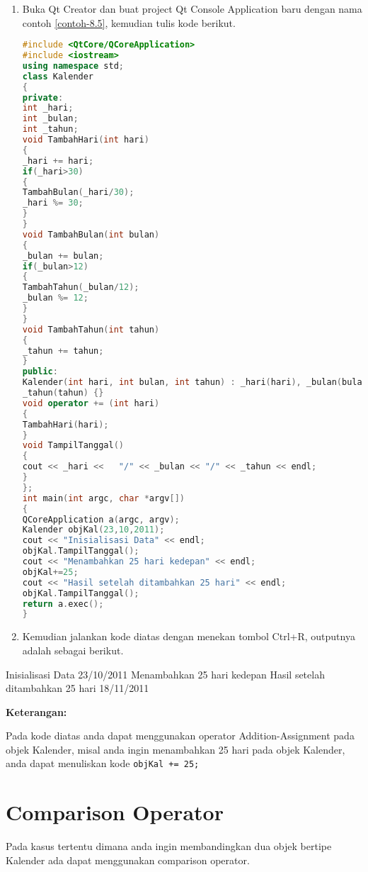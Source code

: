 \begin{enumerate}
\def\labelenumi{\arabic{enumi}.}
\item
  Buka Qt Creator dan buat project Qt Console Application baru dengan
  nama contoh \ref{contoh-8.5}, kemudian tulis kode berikut.

\begin{lstlisting}[language=c++, caption= Menggunakan Addition Assigment Operator dan Substraction
Assigment Operator. label=contoh-8.5]
#include <QtCore/QCoreApplication>
#include <iostream>
using namespace std;
class Kalender
{
private:
int _hari;
int _bulan;
int _tahun;
void TambahHari(int hari)
{
_hari += hari;
if(_hari>30)
{
TambahBulan(_hari/30);
_hari %= 30;
}
}
void TambahBulan(int bulan)
{
_bulan += bulan;
if(_bulan>12)
{
TambahTahun(_bulan/12);
_bulan %= 12;
}
}
void TambahTahun(int tahun)
{
_tahun += tahun;
}
public:
Kalender(int hari, int bulan, int tahun) : _hari(hari), _bulan(bulan),
_tahun(tahun) {}
void operator += (int hari)
{
TambahHari(hari);
}
void TampilTanggal()
{
cout << _hari <<   "/" << _bulan << "/" << _tahun << endl;
}
};
int main(int argc, char *argv[])
{
QCoreApplication a(argc, argv);
Kalender objKal(23,10,2011);
cout << "Inisialisasi Data" << endl;
objKal.TampilTanggal();
cout << "Menambahkan 25 hari kedepan" << endl;
objKal+=25;
cout << "Hasil setelah ditambahkan 25 hari" << endl;
objKal.TampilTanggal();
return a.exec();
}
\end{lstlisting}
\item
  Kemudian jalankan kode diatas dengan menekan tombol Ctrl+R, outputnya
  adalah sebagai berikut.
\end{enumerate}

\begin{lcverbatim}
Inisialisasi Data
23/10/2011
Menambahkan 25 hari kedepan
Hasil setelah ditambahkan 25 hari
18/11/2011
\end{lcverbatim}

\textbf{Keterangan:}

Pada kode diatas anda dapat menggunakan operator Addition-Assignment
pada objek Kalender, misal anda ingin menambahkan 25 hari pada objek
Kalender, anda dapat menuliskan kode \texttt{objKal\ +=\ 25;}

\section{Comparison Operator}\label{comparison-operator}

Pada kasus tertentu dimana anda ingin membandingkan dua objek bertipe
Kalender ada dapat menggunakan comparison operator.

